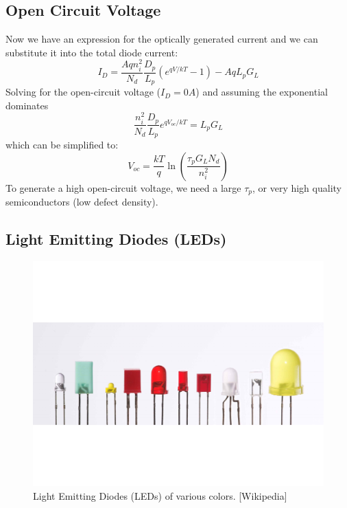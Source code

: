 \subsection{Open Circuit Voltage}

Now we have an expression for the optically generated current and we can substitute it into the total diode current:
\begin{equation} 
	I_D = \frac{A q n_i^2}{N_d} \frac{D_p}{L_p}  (e^{qV/kT} - 1) - A q L_p G_L 
\end{equation}
%
Solving for the open-circuit voltage ($I_D = 0A$) and assuming the exponential dominates
%
\begin{equation} 
	 \frac{  n_i^2}{N_d} \frac{D_p}{L_p}  e^{qV_{oc} /kT}  =  L_p G_L 
\end{equation}
%
which can be simplified to:
%
\begin{equation} 
	 V_{oc} = \frac{kT}{q} \ln \left( \frac{\tau_p G_L N_d}{n_i^2} \right) 
\end{equation}
%
To generate a high open-circuit voltage, we need a large $\tau_p$, or very high quality semiconductors (low defect density).
 




\subsection{Light Emitting Diodes (LEDs)}

\begin{figure}[tb]
\begin{center}
\includegraphics[width=.75\columnwidth]{led}
\end{center}
\caption{Light Emitting Diodes (LEDs) of various colors. [Wikipedia] } \label{fig:led}
\end{figure}

